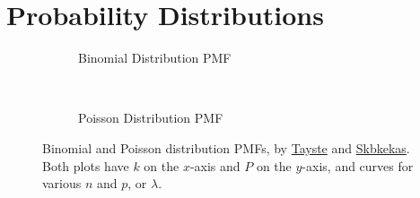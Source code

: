 \chapter{Probability Distributions}
\label{dist}

\begin{figure}
  \centering

  \begin{subfigure}[b]{\wd\largestimage}\centering
  \caption{Binomial Distribution PMF}
  \label{fig:dist:binomial}
  \end{subfigure}
  ~
  \begin{subfigure}[b]{0.48\textwidth}\centering
    \usebox{\largestimage}
  \caption{Poisson Distribution PMF}
  \label{fig:dist:poisson}
  \end{subfigure}
\caption{
Binomial and Poisson distribution PMFs,
by \href{https://en.wikipedia.org/wiki/File:Binomial_distribution_pmf.svg}{Tayste}
and \href{https://en.wikipedia.org/wiki/File:Poisson_pmf.svg}{Skbkekas}.
Both plots have $k$ on the $x$-axis and $P$ on the $y$-axis, and curves for various $n$ and $p$, or $\lambda$.
\label{fig:dist:binomial_poisson}
}
\end{figure}

